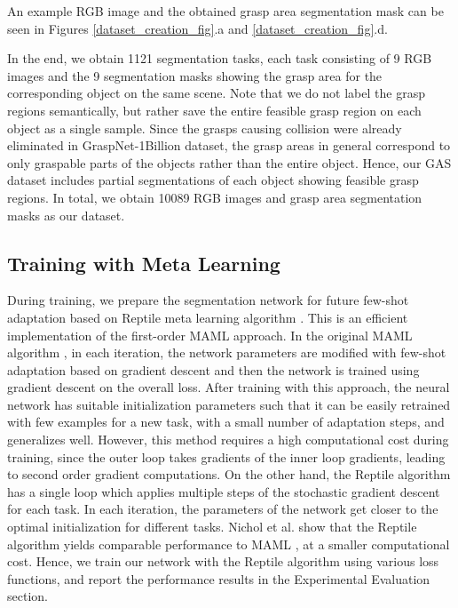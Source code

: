 \documentclass[letterpaper]{article} %
\begin{document}
An example RGB image and the obtained grasp area segmentation mask can be seen in Figures \ref{dataset_creation_fig}.a and \ref{dataset_creation_fig}.d.

In the end, we obtain 1121 segmentation tasks, each task consisting of 9 RGB images and the 9 segmentation masks showing the grasp area for the corresponding object on the same scene. Note that we do not label the grasp regions semantically, but rather save the entire feasible grasp region on each object as a single sample. Since the grasps causing collision were already eliminated in GraspNet-1Billion dataset, the grasp areas in general correspond to only graspable parts of the objects rather than the entire object. Hence, our GAS dataset includes partial segmentations of each object showing feasible grasp regions. In total, we obtain 10089 RGB images and grasp area segmentation masks as our dataset.

\subsection{Training with Meta Learning}
\label{maml_section}

During training, we prepare the segmentation network for future few-shot adaptation based on Reptile meta learning algorithm \cite{nichol2018reptile}. This is an efficient implementation of the first-order MAML approach. In the original MAML algorithm \cite{finn2017model}, in each iteration, the network parameters are modified with few-shot adaptation based on gradient descent and then the network is trained using gradient descent on the overall loss. After training with this approach, the neural network has suitable initialization parameters such that it can be easily retrained with few examples for a new task, with a small number of adaptation steps, and generalizes well. However, this method requires a high computational cost during training, since the outer loop takes gradients of the inner loop gradients, leading to second order gradient computations. On the other hand, the Reptile algorithm has a single loop which applies multiple steps of the stochastic gradient descent for each task. In each iteration, the parameters of the network get closer to the optimal initialization for different tasks. Nichol et al. \cite{nichol2018reptile} show that the Reptile algorithm yields comparable performance to MAML  \cite{finn2017model}, at a smaller computational cost. Hence, we train our network with the Reptile algorithm using various loss functions, and report the performance results in the Experimental Evaluation section. 
\end{document}
